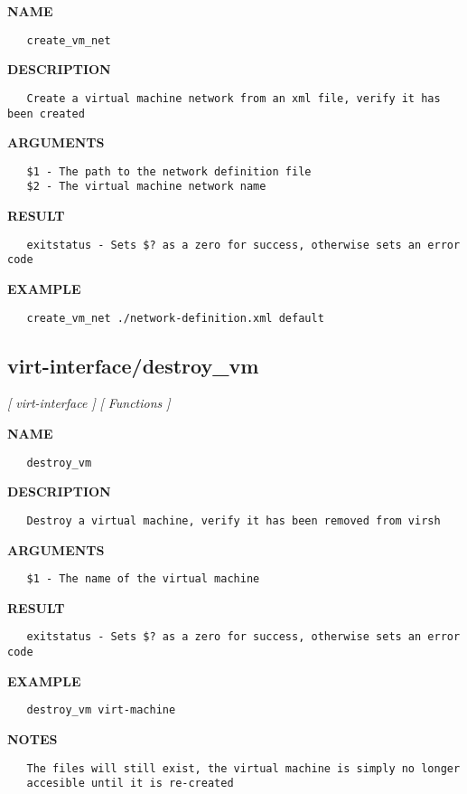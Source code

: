 \label{ch:robo51}
\label{ch:virt_interface_create_vm_net}
\textbf{NAME}
\begin{verbatim}
   create_vm_net
\end{verbatim}
\textbf{DESCRIPTION}
\begin{verbatim}
   Create a virtual machine network from an xml file, verify it has been created 
\end{verbatim}
\textbf{ARGUMENTS}
\begin{verbatim}
   $1 - The path to the network definition file
   $2 - The virtual machine network name
\end{verbatim}
\textbf{RESULT}
\begin{verbatim}
   exitstatus - Sets $? as a zero for success, otherwise sets an error code
\end{verbatim}
\textbf{EXAMPLE}
\begin{verbatim}
   create_vm_net ./network-definition.xml default
\end{verbatim}
\newpage
\subsection{virt-interface/destroy\_vm}
\textsl{[ virt-interface ]}
\textsl{[ Functions ]}

\label{ch:robo52}
\label{ch:virt_interface_destroy_vm}
\textbf{NAME}
\begin{verbatim}
   destroy_vm
\end{verbatim}
\textbf{DESCRIPTION}
\begin{verbatim}
   Destroy a virtual machine, verify it has been removed from virsh
\end{verbatim}
\textbf{ARGUMENTS}
\begin{verbatim}
   $1 - The name of the virtual machine
\end{verbatim}
\textbf{RESULT}
\begin{verbatim}
   exitstatus - Sets $? as a zero for success, otherwise sets an error code
\end{verbatim}
\textbf{EXAMPLE}
\begin{verbatim}
   destroy_vm virt-machine
\end{verbatim}
\textbf{NOTES}
\begin{verbatim}
   The files will still exist, the virtual machine is simply no longer 
   accesible until it is re-created 
\end{verbatim}
\newpage

